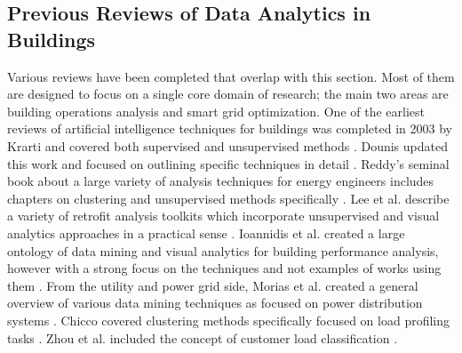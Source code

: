 \subsection{Previous Reviews of Data Analytics in Buildings}
\label{sec:previousreviews}

Various reviews have been completed that overlap with this section. Most of them are designed to focus on a single core domain of research; the main two areas are building operations analysis and smart grid optimization. One of the earliest reviews of artificial intelligence techniques for buildings was completed in 2003 by Krarti and covered both supervised and unsupervised methods \cite{krarti_overview_2003}. Dounis updated this work and focused on outlining specific techniques in detail \cite{dounis_artificial_2010}.  Reddy's seminal book about a large variety of analysis techniques for energy engineers includes chapters on clustering and unsupervised methods specifically \cite{reddy_applied_2011}. Lee et al. describe a variety of retrofit analysis toolkits which incorporate unsupervised and visual analytics approaches in a practical sense \cite{lee_energy_2015}. Ioannidis et al. created a large ontology of data mining and visual analytics for building performance analysis, however with a strong focus on the techniques and not examples of works using them \cite{ioannidis_big_2015}. From the utility and power grid side, Morias et al. created a general overview of various data mining techniques as focused on power distribution systems \cite{morais_overview_2009}. Chicco covered clustering methods specifically focused on load profiling tasks \cite{chicco_overview_2012}. Zhou et al. included the concept of customer load classification  \cite{zhou_review_2013}.\\